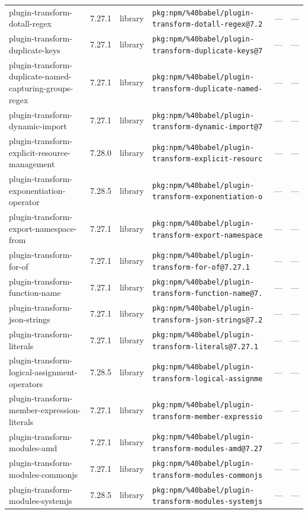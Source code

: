 \documentclass[11pt]{article}
\begin{document}
\begin{longtable}{|l|l|l|p{2.2cm}|l|p{4cm}|}
plugin-transform-dotall-regex & 7.27.1 & library & \texttt{pkg:npm/\%40babel/plugin-transform-dotall-regex@7.2} & — & — \\
plugin-transform-duplicate-keys & 7.27.1 & library & \texttt{pkg:npm/\%40babel/plugin-transform-duplicate-keys@7} & — & — \\
plugin-transform-duplicate-named-capturing-groups-regex & 7.27.1 & library & \texttt{pkg:npm/\%40babel/plugin-transform-duplicate-named-} & — & — \\
plugin-transform-dynamic-import & 7.27.1 & library & \texttt{pkg:npm/\%40babel/plugin-transform-dynamic-import@7} & — & — \\
plugin-transform-explicit-resource-management & 7.28.0 & library & \texttt{pkg:npm/\%40babel/plugin-transform-explicit-resourc} & — & — \\
plugin-transform-exponentiation-operator & 7.28.5 & library & \texttt{pkg:npm/\%40babel/plugin-transform-exponentiation-o} & — & — \\
plugin-transform-export-namespace-from & 7.27.1 & library & \texttt{pkg:npm/\%40babel/plugin-transform-export-namespace} & — & — \\
plugin-transform-for-of & 7.27.1 & library & \texttt{pkg:npm/\%40babel/plugin-transform-for-of@7.27.1} & — & — \\
plugin-transform-function-name & 7.27.1 & library & \texttt{pkg:npm/\%40babel/plugin-transform-function-name@7.} & — & — \\
plugin-transform-json-strings & 7.27.1 & library & \texttt{pkg:npm/\%40babel/plugin-transform-json-strings@7.2} & — & — \\
plugin-transform-literals & 7.27.1 & library & \texttt{pkg:npm/\%40babel/plugin-transform-literals@7.27.1} & — & — \\
plugin-transform-logical-assignment-operators & 7.28.5 & library & \texttt{pkg:npm/\%40babel/plugin-transform-logical-assignme} & — & — \\
plugin-transform-member-expression-literals & 7.27.1 & library & \texttt{pkg:npm/\%40babel/plugin-transform-member-expressio} & — & — \\
plugin-transform-modules-amd & 7.27.1 & library & \texttt{pkg:npm/\%40babel/plugin-transform-modules-amd@7.27} & — & — \\
plugin-transform-modules-commonjs & 7.27.1 & library & \texttt{pkg:npm/\%40babel/plugin-transform-modules-commonjs} & — & — \\
plugin-transform-modules-systemjs & 7.28.5 & library & \texttt{pkg:npm/\%40babel/plugin-transform-modules-systemjs} & — & — \\

\end{longtable}
\end{document}
